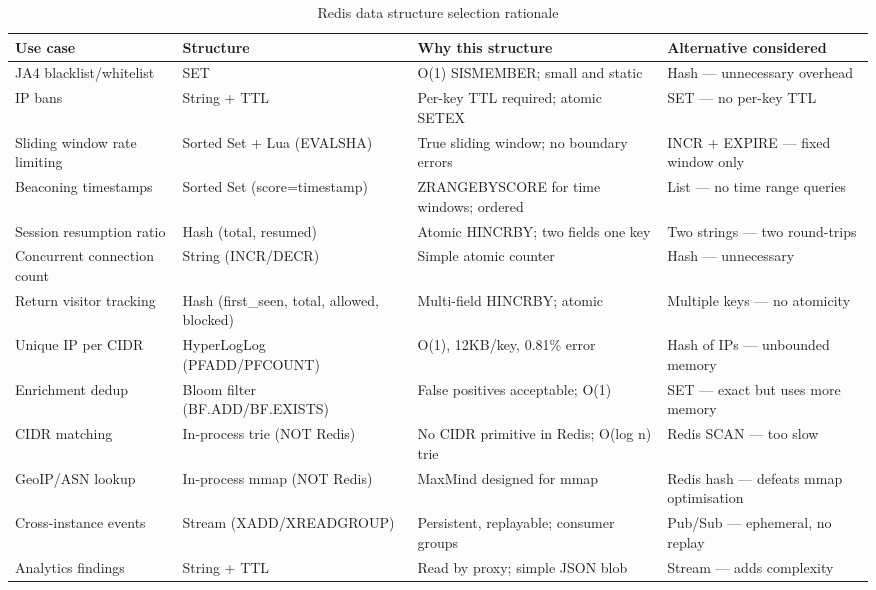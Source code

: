 \begin{fullwidth}
\begin{table}[h]
\caption{Redis data structure selection rationale}
\label{tab:redis-rationale}
\begin{tabular}{@{}llp{4cm}p{4.5cm}@{}}
\toprule
\textbf{Use case} & \textbf{Structure} & \textbf{Why this structure} & \textbf{Alternative considered} \\
\midrule
JA4 blacklist/whitelist & SET & O(1) SISMEMBER; small and static & Hash — unnecessary overhead \\
IP bans & String + TTL & Per-key TTL required; atomic SETEX & SET — no per-key TTL \\
Sliding window rate limiting & Sorted Set + Lua (EVALSHA) & True sliding window; no boundary errors & INCR + EXPIRE — fixed window only \\
Beaconing timestamps & Sorted Set (score=timestamp) & ZRANGEBYSCORE for time windows; ordered & List — no time range queries \\
Session resumption ratio & Hash (total, resumed) & Atomic HINCRBY; two fields one key & Two strings — two round-trips \\
Concurrent connection count & String (INCR/DECR) & Simple atomic counter & Hash — unnecessary \\
Return visitor tracking & Hash (first\_seen, total, allowed, blocked) & Multi-field HINCRBY; atomic & Multiple keys — no atomicity \\
Unique IP per CIDR & HyperLogLog (PFADD/PFCOUNT) & O(1), 12KB/key, 0.81\% error & Hash of IPs — unbounded memory \\
Enrichment dedup & Bloom filter (BF.ADD/BF.EXISTS) & False positives acceptable; O(1) & SET — exact but uses more memory \\
CIDR matching & In-process trie (NOT Redis) & No CIDR primitive in Redis; O(log n) trie & Redis SCAN — too slow \\
GeoIP/ASN lookup & In-process mmap (NOT Redis) & MaxMind designed for mmap & Redis hash — defeats mmap optimisation \\
Cross-instance events & Stream (XADD/XREADGROUP) & Persistent, replayable; consumer groups & Pub/Sub — ephemeral, no replay \\
Analytics findings & String + TTL & Read by proxy; simple JSON blob & Stream — adds complexity \\
\bottomrule
\end{tabular}
\end{table}
\end{fullwidth}

